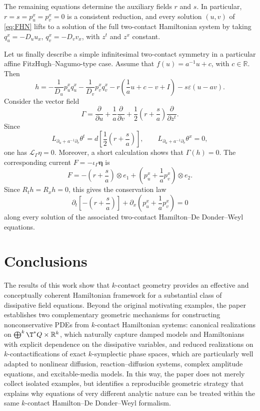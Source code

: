 \documentclass[11pt,a4paper]{article}
\theoremstyle{plain} \newtheorem{theorem}{Theorem}[section] \newtheorem{proposition}[theorem]{Proposition} \newtheorem{corollary}[theorem]{Corollary} \newtheorem{lemma}[theorem]{Lemma} \theoremstyle{definition} \newtheorem{definition}[theorem]{Definition} \theoremstyle{remark} \newtheorem{remark}[theorem]{Remark} \newtheorem{example}[theorem]{Example} %
\begin{document}
The remaining equations determine the auxiliary fields \(r\) and \(s\). In particular, \(r=s=p_u^x=p_v^x=0\) is a consistent reduction, and every solution \((u,v)\) of \eqref{eq:FHN} lifts to a solution of the full two-contact Hamiltonian system by taking \(q_u^x=-D_u u_x\), \(q_v^x=-D_v v_x\), with \(z^t\) and \(z^x\) constant.

Let us finally describe a simple infinitesimal two-contact symmetry in a particular affine FitzHugh--Nagumo-type case. Assume that \(f(u)=a^{-1}u+c\), with \(c\in\mathbb R\). Then
\[
h=-\frac1{D_u}p_u^xq_u^x-\frac1{D_v}p_v^xq_v^x
-r\left(\frac1a u+c-v+I\right)-s\varepsilon(u-av).
\]
Consider the vector field
\[
\Gamma=
\frac{\partial}{\partial u}
+\frac1a\frac{\partial}{\partial v}
+\frac12\left(r+\frac{s}{a}\right)\frac{\partial}{\partial z^t}.
\]
Since
\[
L_{\partial_u+a^{-1}\partial_v}\theta^t
=d\left[\frac12\left(r+\frac{s}{a}\right)\right],
\qquad
L_{\partial_u+a^{-1}\partial_v}\theta^x=0,
\]
one has \(\mathcal{L}_\Gamma\eta=0\). Moreover, a short calculation shows that \(\Gamma(h)=0\). The corresponding current \(F=-\iota_\Gamma\bm\eta\) is
\[
F=
-\left(r+\frac{s}{a}\right)\otimes e_1
+\left(p_u^x+\frac1a p_v^x\right)\otimes e_2.
\]
Since \(R_t h=R_xh=0\), this gives the conservation law
\[
\partial_t\left[-\left(r+\frac{s}{a}\right)\right]
+\partial_x\left(p_u^x+\frac1a p_v^x\right)=0
\]
along every solution of the associated two-contact Hamilton--De Donder--Weyl equations.

\section{Conclusions}\label{sec:conclusions}
 

The results of this work show that \(k\)-contact geometry provides an effective and conceptually coherent Hamiltonian framework for a substantial class of dissipative field equations. Beyond the original motivating examples, the paper establishes two complementary geometric mechanisms for constructing nonconservative PDEs from \(k\)-contact Hamiltonian systems: canonical realizations on \(\bigoplus^k \T^*Q\times\mathbb R^k\), which naturally capture damped models and Hamiltonians with explicit dependence on the dissipative variables, and reduced realizations on $k$-contactifications of exact \(k\)-symplectic phase spaces, which are particularly well adapted to nonlinear diffusion, reaction--diffusion systems, complex amplitude equations, and excitable-media models. In this way, the paper does not merely collect isolated examples, but identifies a reproducible geometric strategy that explains why equations of very different analytic nature can be treated within the same \(k\)-contact Hamilton--De Donder--Weyl formalism.
\end{document}
